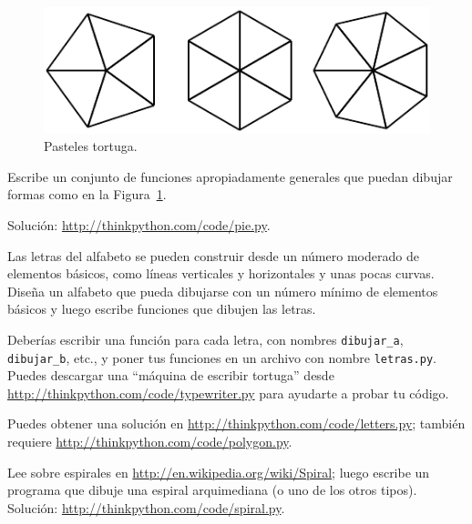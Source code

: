 \documentclass[10pt]{book}
\begin{document}
\begin{figure}
\centerline
{\includegraphics[scale=0.8]{figs/pies.pdf}}
\caption{Pasteles tortuga.}
\label{fig.pies}
\end{figure}


\begin{exercise}

Escribe un conjunto de funciones apropiadamente generales que
puedan dibujar formas como en la Figura~\ref{fig.pies}.

Solución: \url{http://thinkpython.com/code/pie.py}.

\end{exercise}

\begin{exercise}

Las letras del alfabeto se pueden construir desde un número moderado
de elementos básicos, como líneas verticales y horizontales y unas pocas
curvas.  Diseña un alfabeto que pueda dibujarse con un número
mínimo de elementos básicos y luego escribe funciones que dibujen las letras.

Deberías escribir una función para cada letra, con nombres
\verb"dibujar_a", \verb"dibujar_b", etc., y poner tus funciones
en un archivo con nombre {\tt letras.py}.  Puedes descargar una
``máquina de escribir tortuga'' desde \url{http://thinkpython.com/code/typewriter.py}
para ayudarte a probar tu código.

Puedes obtener una solución en \url{http://thinkpython.com/code/letters.py};
también requiere
\url{http://thinkpython.com/code/polygon.py}.

\end{exercise}

\begin{exercise}

Lee sobre espirales en \url{http://en.wikipedia.org/wiki/Spiral}; luego
escribe un programa que dibuje una espiral arquimediana (o uno de los otros
tipos).  Solución: \url{http://thinkpython.com/code/spiral.py}.

\end{exercise}
\end{document}
